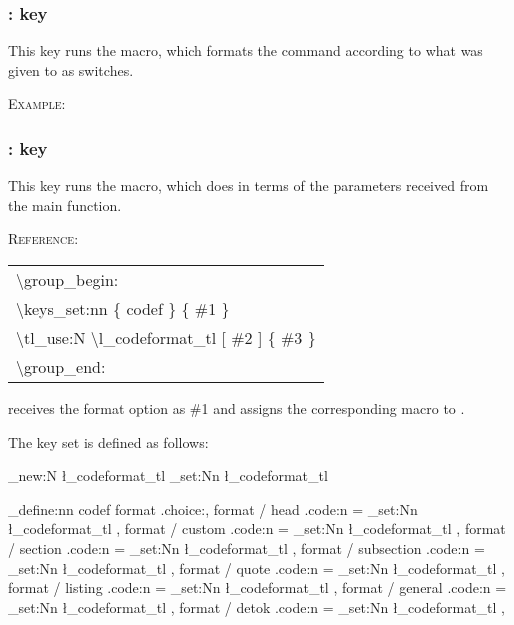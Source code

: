 \documentclass{article}
\newcommand{\ee}{\par\textsc{Example:~}}
\newcommand{\rr}{\par\textsc{Reference:~}}
\newcommand{\reftable}[1]{%
\begin{center}
\begin{tabular}{l}
#1 
\end{tabular}
\end{center}

}
\begin{document}
\subsubsection{\cs{\cdrd}: \cdrd[format=general]{[format=custom]} key}
This key runs the \cs{\cdrdcustom} macro, which formats the command according to what was given to  as switches.
\ee
\cdrq{\cdrd[format=custom][\bfseries\tiny\sffamily]{\xyz}}


\subsubsection{\cs{\cdrd}: \cdrd[format=general]{[format=section]} key}\label{sec:secformat}
This key runs the \cs{\cdrdsection} macro, which does   in terms of the parameters received from the main function.
\rr\reftable{
  \textbackslash group\_begin: \\
  \textbackslash keys\_set:nn \{ codef \} \{ \#1 \} \\
  \textbackslash tl\_use:N \textbackslash l\_codeformat\_tl [ \#2 ] \{ \#3 \} \\
  \textbackslash group\_end: \\
}
\par{} receives the format option as \#1 and assigns the corresponding macro to .
\par The  key set is defined as follows:



\begin{latexcode}
\tl_new:N  \l_codeformat_tl
\tl_set:Nn \l_codeformat_tl { \cdrdplain }

\keys_define:nn { codef }
 {
  format .choice:,
  format / head   .code:n = \tl_set:Nn \l_codeformat_tl  { \cdrdhead },
  format / custom   .code:n = \tl_set:Nn \l_codeformat_tl  { \cdrdcustom }, %
  format / section   .code:n = \tl_set:Nn \l_codeformat_tl  { \cdrdsection }, 
  format / subsection   .code:n = \tl_set:Nn \l_codeformat_tl  { \cdrdsubsection }, 
  format / quote   .code:n = \tl_set:Nn \l_codeformat_tl  { \cdrdquote }, 
  format / listing   .code:n = \tl_set:Nn \l_codeformat_tl  { \cdrdlisting }, 
  format / general   .code:n = \tl_set:Nn \l_codeformat_tl  { \codegeneral }, 
  format / detok   .code:n = \tl_set:Nn \l_codeformat_tl  { \codedetok }, 
   }
\end{latexcode}
\end{document}

